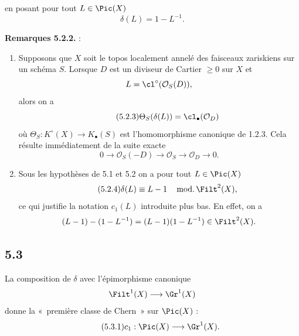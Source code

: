 en
posant pour tout \(L\in\Pic(X)\)
\[
 \delta(L)=1-L^{-1}.
\]

\textbf{Remarques 5.2.2.} :
\begin{enumerate}[label=\alph*)]
\item Supposons que \(X\) soit le topos localement annelé des faisceaux zariskiens sur un schéma \(S\). Lorsque \(D\) est un diviseur de Cartier \(\geq0\) sur \(X\) et
\[
 L=\cl^\circ(\mathcal O_S(D)),
\]
alors on a
\begin{equation}\tag{5.2.3}
 \Theta_S(\delta(L))=\cl_\bullet(\mathcal O_D)
\end{equation}
où \(\Theta_S:K^\circ(X)\to K_\bullet(S)\) est l'homomorphisme canonique de 1.2.3. Cela résulte immédiatement de la suite exacte
\[
0\longrightarrow\mathcal O_S(-D)\longrightarrow\mathcal O_S\longrightarrow\mathcal O_D\longrightarrow0.
\]

\item Sous les hypothèses de 5.1 et 5.2 on a pour tout \(L\in\Pic(X)\)
\begin{equation}\tag{5.2.4}
 \delta(L)\equiv L-1\quad\operatorname{mod.}\Filt^2(X),
\end{equation}
ce qui justifie la notation \(c_1(L)\) introduite plus bas. En effet, on a
\[
 (L-1)-(1-L^{-1})=(L-1)(1-L^{-1})\in\Filt^2(X).
\]
\end{enumerate}

\subsection*{5.3}
La composition de \(\delta\) avec l'épimorphisme canonique
\[
 \Filt^1(X)\longrightarrow\Gr^1(X)
\]
donne la «~première classe de Chern~» sur \(\Pic(X)\) :
\begin{equation}\tag{5.3.1}
 c_1:\Pic(X)\longrightarrow\Gr^1(X).
\end{equation}

